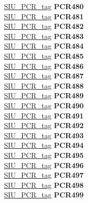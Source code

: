 \begin{DoxyCompactItemize}
\begin{tabbing}
\>\>\mbox{\hyperlink{unionSIU__tag_1_1SIU__PCR__tag}{SIU\_PCR\_tag}} {\bfseries PCR480}\\
\>\>\mbox{\hyperlink{unionSIU__tag_1_1SIU__PCR__tag}{SIU\_PCR\_tag}} {\bfseries PCR481}\\
\>\>\mbox{\hyperlink{unionSIU__tag_1_1SIU__PCR__tag}{SIU\_PCR\_tag}} {\bfseries PCR482}\\
\>\>\mbox{\hyperlink{unionSIU__tag_1_1SIU__PCR__tag}{SIU\_PCR\_tag}} {\bfseries PCR483}\\
\>\>\mbox{\hyperlink{unionSIU__tag_1_1SIU__PCR__tag}{SIU\_PCR\_tag}} {\bfseries PCR484}\\
\>\>\mbox{\hyperlink{unionSIU__tag_1_1SIU__PCR__tag}{SIU\_PCR\_tag}} {\bfseries PCR485}\\
\>\>\mbox{\hyperlink{unionSIU__tag_1_1SIU__PCR__tag}{SIU\_PCR\_tag}} {\bfseries PCR486}\\
\>\>\mbox{\hyperlink{unionSIU__tag_1_1SIU__PCR__tag}{SIU\_PCR\_tag}} {\bfseries PCR487}\\
\>\>\mbox{\hyperlink{unionSIU__tag_1_1SIU__PCR__tag}{SIU\_PCR\_tag}} {\bfseries PCR488}\\
\>\>\mbox{\hyperlink{unionSIU__tag_1_1SIU__PCR__tag}{SIU\_PCR\_tag}} {\bfseries PCR489}\\
\>\>\mbox{\hyperlink{unionSIU__tag_1_1SIU__PCR__tag}{SIU\_PCR\_tag}} {\bfseries PCR490}\\
\>\>\mbox{\hyperlink{unionSIU__tag_1_1SIU__PCR__tag}{SIU\_PCR\_tag}} {\bfseries PCR491}\\
\>\>\mbox{\hyperlink{unionSIU__tag_1_1SIU__PCR__tag}{SIU\_PCR\_tag}} {\bfseries PCR492}\\
\>\>\mbox{\hyperlink{unionSIU__tag_1_1SIU__PCR__tag}{SIU\_PCR\_tag}} {\bfseries PCR493}\\
\>\>\mbox{\hyperlink{unionSIU__tag_1_1SIU__PCR__tag}{SIU\_PCR\_tag}} {\bfseries PCR494}\\
\>\>\mbox{\hyperlink{unionSIU__tag_1_1SIU__PCR__tag}{SIU\_PCR\_tag}} {\bfseries PCR495}\\
\>\>\mbox{\hyperlink{unionSIU__tag_1_1SIU__PCR__tag}{SIU\_PCR\_tag}} {\bfseries PCR496}\\
\>\>\mbox{\hyperlink{unionSIU__tag_1_1SIU__PCR__tag}{SIU\_PCR\_tag}} {\bfseries PCR497}\\
\>\>\mbox{\hyperlink{unionSIU__tag_1_1SIU__PCR__tag}{SIU\_PCR\_tag}} {\bfseries PCR498}\\
\>\>\mbox{\hyperlink{unionSIU__tag_1_1SIU__PCR__tag}{SIU\_PCR\_tag}} {\bfseries PCR499}\\

\end{tabbing}
\end{DoxyCompactItemize}
